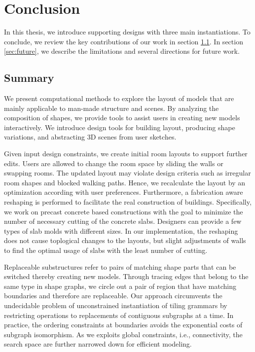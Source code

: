 

\chapter{Conclusion}
\label{chapter:conclusion}

In this thesis, we introduce supporting designs with three main instantiations. To conclude, we review the key contributions of our work in section \ref{sec:summary}. In section \ref{sec:future}, we describe the limitations and several directions for future work.

\section{Summary}
\label{sec:summary}

We present computational methods to explore the layout of models that are mainly applicable to man-made structure and scenes. By analyzing the composition of shapes, we provide tools to assist users in creating new models interactively. We introduce design tools for building layout, producing shape variations, and abstracting 3D scenes from user sketches.

 Given input design constraints, we create initial room layouts to support further edits. Users are allowed to change the room space by sliding the walls or swapping rooms. The updated layout may violate design criteria such as irregular room shapes and blocked walking paths. Hence, we recalculate the layout by an optimization according with user preferences. Furthermore, a fabrication aware reshaping is performed to facilitate the real construction of buildings. Specifically, we work on precast concrete based constructions with the goal to minimize the number of necessary cutting of the concrete slabs. Designers can provide a few types of slab molds with different sizes. In our implementation, the reshaping does not cause toplogical changes to the layouts, but slight adjustments of walls to find the optimal usage of slabs with the least number of cutting.


%
Replaceable substructures refer to pairs of matching shape parts that can be switched thereby creating new models. Through tracing edges that belong to the same type in shape graphs, we circle out a pair of region that have matching boundaries and therefore are replaceable. Our approach circumvents the undecidable problem of unconstrained instantiation of tiling grammars by restricting operations to replacements of contiguous subgraphs at a time. In practice, the ordering constraints at boundaries avoids the exponential costs of subgraph isomorphism. As we exploits global constraints, i.e., connectivity, the search space are further narrowed down for efficient modeling.

